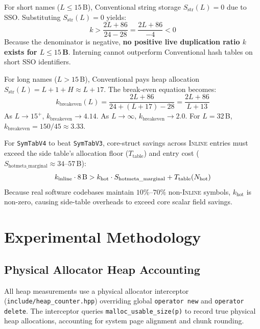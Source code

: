 \documentclass[conference]{IEEEtran}
\begin{document}
For short names ($L \le 15$\,B), Conventional string storage $S_{\text{str}}(L) = 0$ due to SSO. Substituting $S_{\text{str}}(L) = 0$ yields:
\begin{equation}
k > \frac{2L + 86}{24 - 28} = \frac{2L + 86}{-4} < 0
\end{equation}
Because the denominator is negative, \textbf{no positive live duplication ratio $k$ exists for $L \le 15$\,B}. Interning cannot outperform Conventional hash tables on short SSO identifiers.

For long names ($L > 15$\,B), Conventional pays heap allocation $S_{\text{str}}(L) = L + 1 + H \approx L + 17$. The break-even equation becomes:
\begin{equation}
k_{\text{breakeven}}(L) = \frac{2L + 86}{24 + (L + 17) - 28} = \frac{2L + 86}{L + 13}
\end{equation}
As $L \to 15^{+}$, $k_{\text{breakeven}} \to 4.14$. As $L \to \infty$, $k_{\text{breakeven}} \to 2.0$. For $L = 32$\,B, $k_{\text{breakeven}} = 150/45 \approx 3.33$.

For \texttt{SymTabV4} to beat \texttt{SymTabV3}, core-struct savings across \textsc{Inline} entries must exceed the side table's allocation floor ($T_{\text{table}}$) and entry cost ($S_{\text{hotmeta\_marginal}} \approx 34\text{--}57$\,B):
\begin{equation}
k_{\text{inline}} \cdot 8\text{\,B} > k_{\text{hot}} \cdot S_{\text{hotmeta\_marginal}} + T_{\text{table}}(N_{\text{hot}})
\end{equation}
Because real software codebases maintain $10\%$--$70\%$ non-\textsc{Inline} symbols, $k_{\text{hot}}$ is non-zero, causing side-table overheads to exceed core scalar field savings.

\section{Experimental Methodology}

\subsection{Physical Allocator Heap Accounting}
All heap measurements use a physical allocator interceptor (\texttt{include/heap\_counter.hpp}) overriding global \texttt{operator new} and \texttt{operator delete}. The interceptor queries \texttt{malloc\_usable\_size(p)} to record true physical heap allocations, accounting for system page alignment and chunk rounding.
\end{document}
